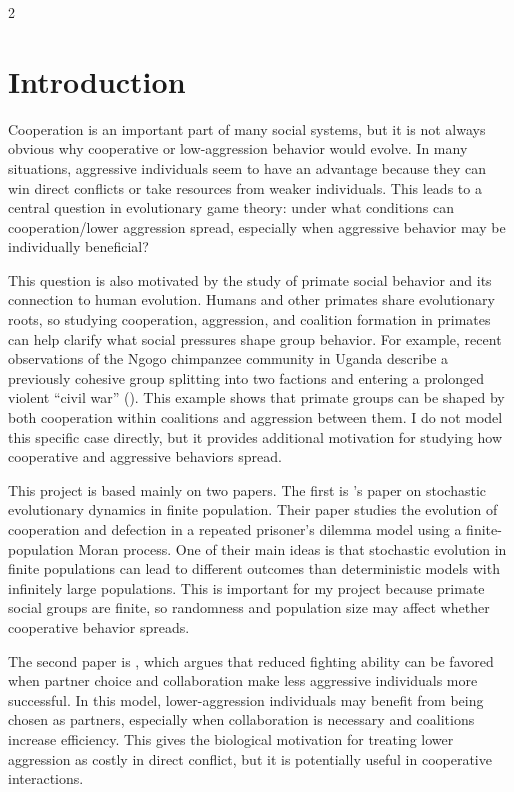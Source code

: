 \documentclass[11pt]{article}
\begin{document}
\begin{multicols}{2}

\section{Introduction}

Cooperation is an important part of many social systems, but it is not always obvious why cooperative or low-aggression behavior would evolve. In many situations, aggressive individuals seem to have an advantage because they can win direct conflicts or take resources from weaker individuals. This leads to a central question in evolutionary game theory: under what conditions can cooperation/lower aggression spread, especially when aggressive behavior may be individually beneficial?

This question is also motivated by the study of primate social behavior and its connection to human evolution. Humans and other primates share evolutionary roots, so studying cooperation, aggression, and coalition formation in primates can help clarify what social pressures shape group behavior. For example, recent observations of the Ngogo chimpanzee community in Uganda describe a previously cohesive group splitting into two factions and entering a prolonged violent ``civil war'' (\cite{Sandel2026}). This example shows that primate groups can be shaped by both cooperation within coalitions and aggression between them. I do not model this specific case directly, but it provides additional motivation for studying how cooperative and aggressive behaviors spread. 

This project is based mainly on two papers. The first is \cite{Imhof2005}'s paper on stochastic evolutionary dynamics in finite population. Their paper studies the evolution of cooperation and defection in a repeated prisoner's dilemma model using a finite-population Moran process. One of their main ideas is that stochastic evolution in finite populations can lead to different outcomes than deterministic models with infinitely large populations. This is important for my project because primate social groups are finite, so randomness and population size may affect whether cooperative behavior spreads.

The second paper is \cite{Ihara2020}, which argues that reduced fighting ability can be favored when partner choice and collaboration make less aggressive individuals more successful. In this model, lower-aggression individuals may benefit from being chosen as partners, especially when collaboration is necessary and coalitions increase efficiency. This gives the biological motivation for treating lower aggression as costly in direct conflict, but it is potentially useful in cooperative  interactions.


\end{multicols}
\end{document}
